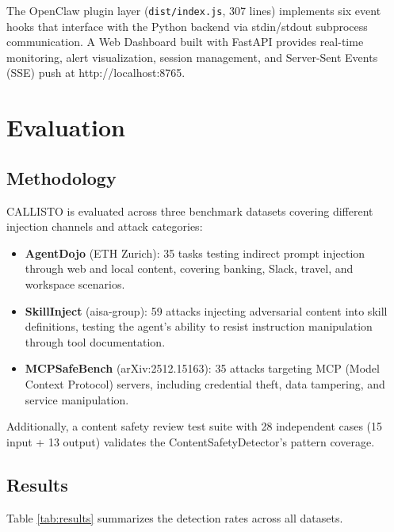 \documentclass[10pt,conference]{IEEEtran}
\begin{document}
The OpenClaw plugin layer (\texttt{dist/index.js}, 307 lines) implements six event hooks that interface with the Python backend via stdin/stdout subprocess communication. A Web Dashboard built with FastAPI provides real-time monitoring, alert visualization, session management, and Server-Sent Events (SSE) push at http://localhost:8765.

\section{Evaluation}

\subsection{Methodology}

CALLISTO is evaluated across three benchmark datasets covering different injection channels and attack categories:

\begin{itemize}
    \item \textbf{AgentDojo} (ETH Zurich): 35 tasks testing indirect prompt injection through web and local content, covering banking, Slack, travel, and workspace scenarios.
    \item \textbf{SkillInject} (aisa-group): 59 attacks injecting adversarial content into skill definitions, testing the agent's ability to resist instruction manipulation through tool documentation.
    \item \textbf{MCPSafeBench} (arXiv:2512.15163): 35 attacks targeting MCP (Model Context Protocol) servers, including credential theft, data tampering, and service manipulation.
\end{itemize}

Additionally, a content safety review test suite with 28 independent cases (15 input + 13 output) validates the ContentSafetyDetector's pattern coverage.

\subsection{Results}

Table \ref{tab:results} summarizes the detection rates across all datasets.
\end{document}
